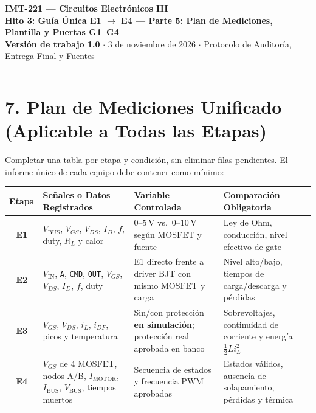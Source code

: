 \documentclass[10pt, a4paper, landscape]{article}
\begin{document}
\noindent
{\LARGE \textbf{\textcolor{ucbblue}{IMT-221 — Circuitos Electrónicos III}}}\\[0.15cm]
{\Large \textbf{Hito 3: Guía Única E1 $\rightarrow$ E4 — Parte 5: Plan de Mediciones, Plantilla y Puertas G1--G4}}\\[0.1cm]
{\small \textbf{Versión de trabajo 1.0} $\cdot$ 3 de noviembre de 2026 $\cdot$ Protocolo de Auditoría, Entrega Final y Fuentes}
\par\vspace{0.2cm}\noindent\rule{\linewidth}{0.4pt}\vspace{0.3cm}

\section*{7. Plan de Mediciones Unificado (Aplicable a Todas las Etapas)}

Completar una tabla por etapa y condición, sin eliminar filas pendientes. El informe único de cada equipo debe contener como mínimo:

\par\vspace{0.15cm}\noindent
\renewcommand{\arraystretch}{1.28}
\begin{tabularx}{\linewidth}{|c|p{4.8cm}|p{4.2cm}|X|}
\hline
\rowcolor{ucbgray}
\textbf{Etapa} & \textbf{Señales o Datos Registrados} & \textbf{Variable Controlada} & \textbf{Comparación Obligatoria} \\ \hline
\textbf{E1} & $V_{\text{BUS}}$, $V_{GS}$, $V_{DS}$, $I_D$, $f$, duty, $R_L$ y calor & $0\text{--}5\,\text{V}$ vs.\ $0\text{--}10\,\text{V}$ según MOSFET y fuente & Ley de Ohm, conducción, nivel efectivo de gate \\ \hline
\textbf{E2} & $V_{\text{IN}}$, \texttt{A}, \texttt{CMD}, \texttt{OUT}, $V_{GS}$, $V_{DS}$, $I_D$, $f$, duty & E1 directo frente a driver BJT con mismo MOSFET y carga & Nivel alto/bajo, tiempos de carga/descarga y pérdidas \\ \hline
\textbf{E3} & $V_{GS}$, $V_{DS}$, $i_L$, $i_{DF}$, picos y temperatura & Sin/con protección \textbf{en simulación}; protección real aprobada en banco & Sobrevoltajes, continuidad de corriente y energía $\frac{1}{2}L i_L^2$ \\ \hline
\textbf{E4} & $V_{GS}$ de 4 MOSFET, nodos A/B, $I_{\text{MOTOR}}$, $I_{\text{BUS}}$, $V_{\text{BUS}}$, tiempos muertos & Secuencia de estados y frecuencia PWM aprobadas & Estados válidos, ausencia de solapamiento, pérdidas y térmica \\ \hline
\end{tabularx}
\end{document}
